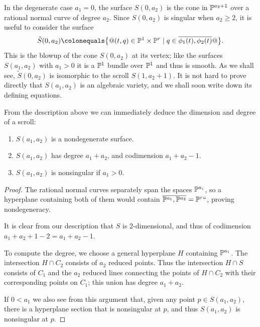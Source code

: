In the degenerate case $a_{1}= 0$, the surface $S(0,a_{2})$ is the cone
in ${\mathbb P}^{a_{2}+1}$ over a rational normal curve of degree $a_{2}$.
 Since $S(0,a_2)$ is singular when $a_2\geq 2$,
it is useful to consider the surface
$$
\tilde S(0, a_2) \colonequals  \bigl\{@ (t, q) \in \PP^1 \times \PP^r
\mid q \in \overline{\phi_1(t), \phi_2(t)}@\bigr\}.
$$
This is the 
%
blowup of the cone $S(0, a_2)$ at its vertex; like the
surfaces $S(a_1,a_2)$ with $a_1 > 0$ it is a ${\mathbb P}^1$ bundle over ${\mathbb P}^1$
and thus is smooth. As we shall see, $\tilde S(0, a_2)$ is isomorphic
to the scroll $S(1, a_2+1)$.
It is not hard to prove directly that $S(a_1,a_2)$ is an algebraic
variety, and we shall soon write down its defining equations.

From the description above we can immediately deduce the dimension and
degree of a scroll:

\begin{proposition}
\begin{enumerate}
\item $S(a_1,a_2)$ is a nondegenerate surface.
\item $S(a_1,a_2)$ has degree $a_1+a_2$, and codimension $a_1+a_2-1$.
\item $S(a_{1},a_{2})$ is nonsingular if $a_{1}>0$.
\unif
\end{enumerate}
\end{proposition}

\begin{proof}
The rational normal curves separately span the spaces ${\mathbb P}^{a_i}$, so a
hyperplane containing both of them would contain $\overline{{\mathbb P}^{a_1},
{\mathbb P}^{a_{2}}} = {\mathbb P}^r` `$, proving nondegeneracy.

It is clear from our description that $S$ is 2-dimensional, and thus of
codimension $a_{1}+a_{2}+1 -2 = a_{1}+a_{2}-1$.

To compute the degree, we choose a general hyperplane $H$ containing
${\mathbb P}^{a_{1}}$. The intersection $H\cap C_{2}$ consists of $a_{2}$
reduced points. Thus the intersection $H\cap S$ consists of $C_{1}$
and the $a_{2}$ reduced lines connecting
the points of $H\cap C_{2}$ with their corresponding points on $C_{1}$;
this union has degree $a_{1}+a_{2}$.

If $0< a_{1}$ we also see from this argument that, given any point  $p\in
S(a_{1},a_{2})$, there is
a hyperplane section that is nonsingular at $p$, and thus $S(a_{1},a_{2})$
is nonsingular at $p$.
\end{proof}

